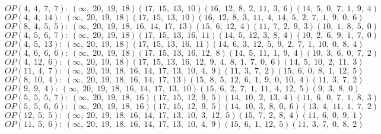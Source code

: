 $OP(4, \;4, \;7, \;7): \:(\infty, \;20, \;19, \;18)(17, \;15, \;13, \;10)(16, \;12, \;8, \;2, \;11, \;3, \;6)(14, \;5, \;0, \;7, \;1, \;9, \;4)$\\
$OP(4, \;4, \;14): \:(\infty, \;20, \;19, \;18)(17, \;15, \;13, \;10)(16, \;12, \;8, \;3, \;11, \;4, \;14, \;5, \;2, \;7, \;1, \;9, \;0, \;6)$\\
$OP(8, \;4, \;5, \;5): \:(\infty, \;20, \;19, \;18, \;16, \;14, \;17, \;13)(15, \;6, \;12, \;4)(11, \;7, \;2, \;9, \;3)(10, \;1, \;8, \;5, \;0)$\\
$OP(4, \;5, \;6, \;7): \:(\infty, \;20, \;19, \;18)(17, \;15, \;13, \;16, \;11)(14, \;5, \;12, \;3, \;8, \;4)(10, \;2, \;6, \;9, \;1, \;7, \;0)$\\
$OP(4, \;5, \;13): \:(\infty, \;20, \;19, \;18)(17, \;15, \;13, \;16, \;11)(14, \;6, \;3, \;12, \;5, \;9, \;2, \;7, \;1, \;10, \;0, \;8, \;4)$\\
$OP(4, \;6, \;6, \;6): \:(\infty, \;20, \;19, \;18)(17, \;15, \;13, \;16, \;12, \;8)(14, \;5, \;11, \;1, \;9, \;4)(10, \;3, \;6, \;0, \;7, \;2)$\\
$OP(4, \;12, \;6): \:(\infty, \;20, \;19, \;18)(17, \;15, \;13, \;16, \;12, \;9, \;4, \;8, \;1, \;7, \;0, \;6)(14, \;5, \;10, \;2, \;11, \;3)$\\
$OP(11, \;4, \;7): \:(\infty, \;20, \;19, \;18, \;16, \;14, \;17, \;13, \;10, \;4, \;9)(11, \;3, \;7, \;2)(15, \;6, \;0, \;8, \;1, \;12, \;5)$\\
$OP(8, \;10, \;4): \:(\infty, \;20, \;19, \;18, \;16, \;14, \;17, \;13)(15, \;8, \;5, \;12, \;6, \;1, \;9, \;0, \;10, \;4)(11, \;3, \;7, \;2)$\\
$OP(9, \;9, \;4): \:(\infty, \;20, \;19, \;18, \;16, \;14, \;17, \;13, \;10)(15, \;6, \;2, \;7, \;1, \;11, \;4, \;12, \;5)(9, \;3, \;8, \;0)$\\
$OP(5, \;5, \;5, \;7): \:(\infty, \;20, \;19, \;18, \;16)(17, \;15, \;12, \;9, \;5)(14, \;10, \;2, \;13, \;4)(11, \;6, \;0, \;7, \;1, \;8, \;3)$\\
$OP(5, \;5, \;6, \;6): \:(\infty, \;20, \;19, \;18, \;16)(17, \;15, \;12, \;9, \;5)(14, \;10, \;3, \;8, \;0, \;6)(13, \;4, \;11, \;1, \;7, \;2)$\\
$OP(12, \;5, \;5): \:(\infty, \;20, \;19, \;18, \;16, \;14, \;17, \;13, \;10, \;3, \;12, \;5)(15, \;7, \;2, \;8, \;4)(11, \;6, \;0, \;9, \;1)$\\
$OP(11, \;5, \;6): \:(\infty, \;20, \;19, \;18, \;16, \;14, \;17, \;13, \;10, \;4, \;9)(15, \;6, \;1, \;12, \;5)(11, \;3, \;7, \;0, \;8, \;2)$\\
